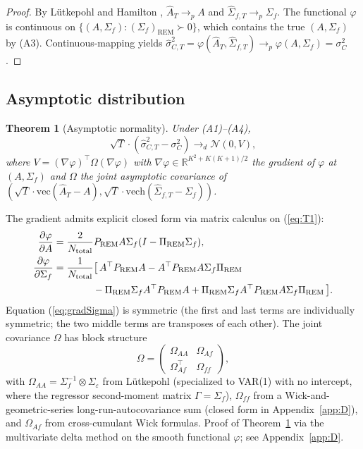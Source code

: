 \documentclass[11pt,letterpaper]{article}
\newtheorem{theorem}{Theorem}
\theoremstyle{remark}
\newcommand{\REM}{\mathrm{REM}}
\newcommand{\PiREM}{\Pi_{\REM}}
\newcommand{\PREM}{P_{\REM}}
\newcommand{\Ntot}{N_{\mathrm{total}}}
\newcommand{\vech}{\mathrm{vech}}
\begin{document}
\begin{proof}
By Lütkepohl \cite[Proposition~3.1, p.~74]{Lutkepohl2005} and Hamilton \cite[Proposition~11.1, p.~298]{Hamilton1994}, $\widehat{A}_T \to_p A$ and $\widehat{\Sigma}_{f, T} \to_p \Sigma_f$. The functional $\varphi$ is continuous on $\{(A, \Sigma_f): (\Sigma_f)_\REM \succ 0\}$, which contains the true $(A, \Sigma_f)$ by (A3). Continuous-mapping yields $\widehat{\sigma}^2_{C, T} = \varphi(\widehat{A}_T, \widehat{\Sigma}_{f, T}) \to_p \varphi(A, \Sigma_f) = \sigma^2_C$.
\end{proof}

\subsection{Asymptotic distribution}\label{sec:T4}

\begin{theorem}[Asymptotic normality]\label{thm:T4}
Under (A1)--(A4),
\begin{equation*}
\sqrt{T} \cdot (\widehat{\sigma}^2_{C, T} - \sigma^2_C) \to_d \mathcal{N}(0, V),
\end{equation*}
where $V = (\nabla \varphi)^\top \Omega (\nabla \varphi)$ with $\nabla \varphi \in \mathbb{R}^{K^2 + K(K+1)/2}$ the gradient of $\varphi$ at $(A, \Sigma_f)$ and $\Omega$ the joint asymptotic covariance of $(\sqrt{T} \cdot \mathrm{vec}(\widehat{A}_T - A), \sqrt{T} \cdot \vech(\widehat{\Sigma}_{f, T} - \Sigma_f))$.
\end{theorem}

The gradient admits explicit closed form via matrix calculus on (\ref{eq:T1}):
\begin{align}
\frac{\partial \varphi}{\partial A} &= \frac{2}{\Ntot} \PREM A \Sigma_f (I - \PiREM \Sigma_f), \label{eq:gradA} \\
\frac{\partial \varphi}{\partial \Sigma_f} &= \frac{1}{\Ntot} \bigl[\, A^\top \PREM A - A^\top \PREM A \Sigma_f \PiREM \notag \\
&\qquad\qquad - \PiREM \Sigma_f A^\top \PREM A + \PiREM \Sigma_f A^\top \PREM A \Sigma_f \PiREM \,\bigr]. \label{eq:gradSigma}
\end{align}
Equation (\ref{eq:gradSigma}) is symmetric (the first and last terms are individually symmetric; the two middle terms are transposes of each other). The joint covariance $\Omega$ has block structure
\begin{equation*}
\Omega = \begin{pmatrix} \Omega_{AA} & \Omega_{Af} \\ \Omega_{Af}^\top & \Omega_{ff} \end{pmatrix},
\end{equation*}
with $\Omega_{AA} = \Sigma_f^{-1} \otimes \Sigma_\varepsilon$ from Lütkepohl \cite[Proposition~3.1, p.~74]{Lutkepohl2005} (specialized to VAR(1) with no intercept, where the regressor second-moment matrix $\Gamma = \Sigma_f$), $\Omega_{ff}$ from a Wick-and-geometric-series long-run-autocovariance sum (closed form in Appendix~\ref{app:D}), and $\Omega_{Af}$ from cross-cumulant Wick formulas. Proof of Theorem~\ref{thm:T4} via the multivariate delta method on the smooth functional $\varphi$; see Appendix~\ref{app:D}.
\end{document}
